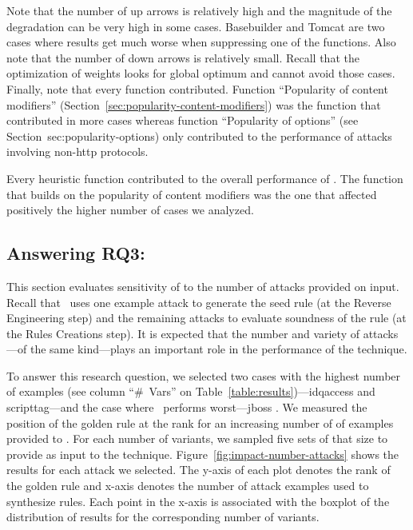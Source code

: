 \documentclass[sigconf,review, anonymous]{acmart}
\begin{document}
Note that the number of up arrows is relatively high and the magnitude
of the degradation can be very high in some cases. Basebuilder and
Tomcat are two cases where results get much worse when suppressing one
of the functions. Also note that the number of down arrows is
relatively small. Recall that the optimization of weights looks for
global optimum and cannot avoid those cases. Finally, note that every
function contributed. Function ``Popularity of content modifiers''
(Section~\ref{sec:popularity-content-modifiers}) was the function that
contributed in more cases whereas function ``Popularity of options''
(see Section~{sec:popularity-options}) only contributed to the
performance of attacks involving non-http protocols.


\begin{center}
\begin{tcolorbox}[enhanced,width=3.3in,center upper,drop shadow southwest,sharp corners]
Every heuristic function contributed to the overall performance of
\tname. The function that builds on the popularity of content
modifiers was the one that affected positively the higher number of
cases we analyzed.
\end{tcolorbox}
\end{center}

\subsection{Answering RQ3: \textRQthree}
\label{sec:answer-rqthree}

This section evaluates sensitivity of \tname{} to the number of
attacks provided on input. Recall that \tname\ uses one example attack
to generate the seed rule (at the Reverse Engineering step) and the
remaining attacks to evaluate soundness of the rule (at the Rules
Creations step). It is expected that the number and variety of
attacks---of the same kind---plays an important role in the
performance of the technique.

To answer this research question, we selected two cases with the
highest number of examples (see column ``\#~Vars'' on
Table~\ref{table:results})---idqaccess and scripttag---and the case
where \tname\ performs worst---jboss . We measured the position of the
golden rule at the rank for an increasing number of of examples
provided to \tname. For each number of variants, we sampled five sets
of that size to provide as input to the
technique. Figure~\ref{fig:impact-number-attacks} shows the results
for each attack we selected. The y-axis of each plot denotes the rank
of the golden rule and x-axis denotes the number of attack examples
used to synthesize rules. Each point in the x-axis is associated with
the boxplot of the distribution of results for the corresponding
number of variants.
 
\end{document}
